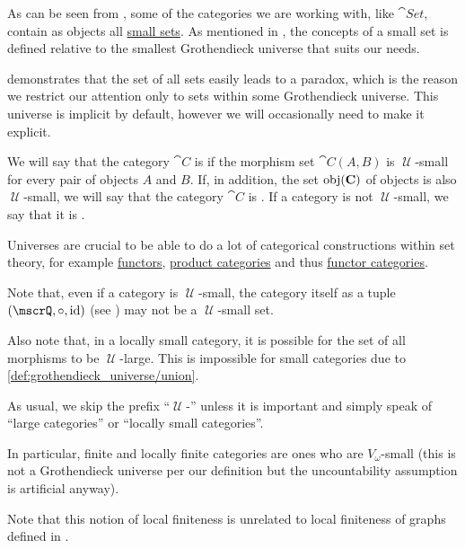 \begin{definition}\label{def:category_size}
  As can be seen from , some of the categories we are working with, like \( \cat{Set} \), contain as objects all \hyperref[def:large_and_small_sets]{small sets}. As mentioned in , the concepts of a small set is defined relative to the smallest Grothendieck universe that suits our needs.

   demonstrates that the set of all sets easily leads to a paradox, which is the reason we restrict our attention only to sets within some Grothendieck universe. This universe is implicit by default, however we will occasionally need to make it explicit.

  We will say that the category \( \cat{C} \) is  if the morphism set \( \cat{C}(A, B) \) is \( \mscrU \)-small for every pair of objects \( A \) and \( B \). If, in addition, the set \( \operatorname{obj}(\operatorname{\mathbf{C}}) \) of objects is also \( \mscrU \)-small, we will say that the category \( \cat{C} \) is . If a category is not \( \mscrU \)-small, we say that it is .

  Universes are crucial to be able to do a lot of categorical constructions within set theory, for example \hyperref[def:functors]{functors}, \hyperref[def:product_category]{product categories} and thus \hyperref[def:functor_category]{functor categories}.

  Note that, even if a category is \( \mscrU \)-small, the category itself as a tuple \( (\mscrQ, \bincirc, \id) \) (see ) may not be a \( \mscrU \)-small set.

  Also note that, in a locally small category, it is possible for the set of all morphisms to be \( \mscrU \)-large. This is impossible for small categories due to \ref{def:grothendieck_universe/union}.

  As usual, we skip the prefix \enquote{\( \mscrU \)-} unless it is important and simply speak of \enquote{large categories} or \enquote{locally small categories}.

  In particular, finite and locally finite categories are ones who are \( V_\omega \)-small (this is not a Grothendieck universe per our definition but the uncountability assumption is artificial anyway).

  Note that this notion of local finiteness is unrelated to local finiteness of graphs defined in .
\end{definition}

